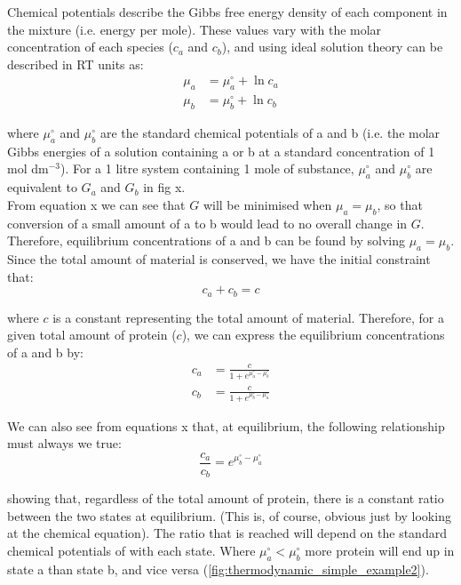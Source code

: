 \documentclass[12pt]{"report"}
\begin{document}
Chemical potentials describe the Gibbs free energy density of each component in the mixture (i.e. energy per mole). These values vary with the molar concentration of each species ($c_a$ and $c_b$), and using ideal solution theory can be described in RT units as:
\begin{align}
\mu_a &= \mu_a^{\circ} + \ln c_a\\
\mu_b &= \mu_b^{\circ} + \ln c_b
\end{align} 

where $\mu_a^{\circ}$ and $\mu_b^{\circ}$ are the standard chemical potentials of a and b (i.e. the molar Gibbs energies of a solution containing a or b at a standard concentration of 1 mol dm$^{-3}$). For a 1 litre system containing 1 mole of substance, $\mu_a^{\circ}$ and $\mu_b^{\circ}$ are equivalent to $G_a$ and $G_b$ in fig x.\\

From equation x we can see that $G$ will be minimised when $\mu_a = \mu_b$, so that conversion of a small amount of a to b would lead to no overall change in $G$. Therefore, equilibrium concentrations of a and b can be found by solving $\mu_a = \mu_b$. Since the total amount of material is conserved, we have the initial constraint that:
\begin{equation}
c_a + c_b = c
\end{equation}

where $c$ is a constant representing the total amount of material. Therefore, for a given total amount of protein ($c$), we can express the equilibrium concentrations of a and b by:
\begin{align}
c_a &= \frac{c}{1 + e^{\mu_a^{\circ} - \mu_b^{\circ}}}\\
c_b &= \frac{c}{1 + e^{\mu_b^{\circ} - \mu_a^{\circ}}}
\end{align}

We can also see from equations x that, at equilibrium, the following relationship must always we true:
\begin{equation}
\frac{c_a}{c_b} = e^{\mu_b^{\circ} - \mu_a^{\circ}}
\end{equation}

showing that, regardless of the total amount of protein, there is a constant ratio between the two states at equilibrium. (This is, of course, obvious just by looking at the chemical equation). The ratio that is reached will depend on the standard chemical potentials of with each state. Where $\mu_a^{\circ} < \mu_b^{\circ}$ more protein will end up in state a than state b, and vice versa (\cref{fig:thermodynamic_simple_example2}).\\
\end{document}
